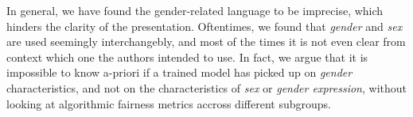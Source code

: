 \documentclass[nonacm,sigconf,review,balance=false]{acmart}
\begin{document}





In general, we have found the gender-related language to be imprecise, which hinders the clarity of the presentation. Oftentimes, we found that \emph{gender} and \emph{sex} are used seemingly interchangebly, and most of the times it is not even clear from context which one the authors intended to use. In fact, we argue that it is impossible to know a-priori if a trained model has picked up on \emph{gender} characteristics, and not on the characteristics of \emph{sex} or \emph{gender expression}, without looking at algorithmic fairness metrics accross different subgroups.
\end{document}

